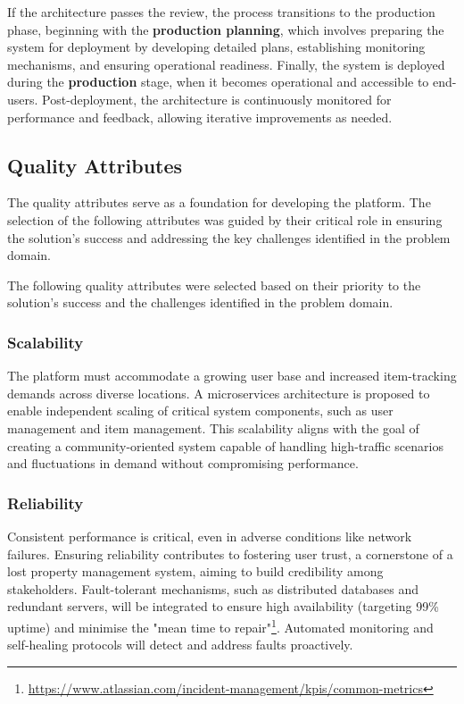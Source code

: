 If the architecture passes the review, the process transitions to the production phase, beginning with the \textbf{production planning}, which involves preparing the system for deployment by developing detailed plans, establishing monitoring mechanisms, and ensuring operational readiness. Finally, the system is deployed during the \textbf{production} stage, when it becomes operational and accessible to end-users. Post-deployment, the architecture is continuously monitored for performance and feedback, allowing iterative improvements as needed.


\subsection{Quality Attributes} \label{section:quality_attributes}

The quality attributes serve as a foundation for developing the platform. The selection of the following attributes was guided by their critical role in ensuring the solution's success and addressing the key challenges identified in the problem domain.

The following quality attributes were selected based on their priority to the solution's success and the challenges identified in the problem domain.

\subsubsection{Scalability}

The platform must accommodate a growing user base and increased item-tracking demands across diverse locations. A microservices architecture is proposed to enable independent scaling of critical system components, such as user management and item management. This scalability aligns with the goal of creating a community-oriented system capable of handling high-traffic scenarios and fluctuations in demand without compromising performance.

\subsubsection{Reliability} 

Consistent performance is critical, even in adverse conditions like network failures. Ensuring reliability contributes to fostering user trust, a cornerstone of a lost property management system, aiming to build credibility among stakeholders. Fault-tolerant mechanisms, such as distributed databases and redundant servers, will be integrated to ensure high availability (targeting 99\% uptime) and minimise the "mean time to repair"\footnote{\url{https://www.atlassian.com/incident-management/kpis/common-metrics}}. Automated monitoring and self-healing protocols will detect and address faults proactively.

